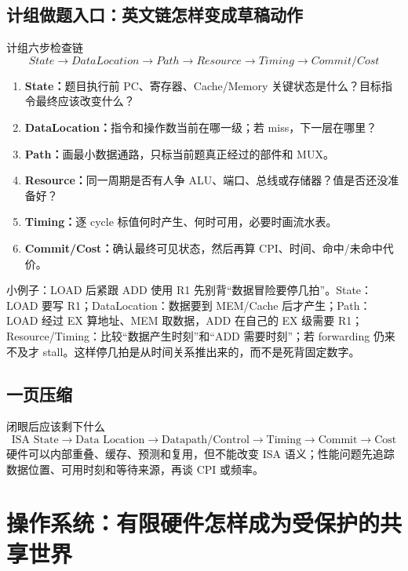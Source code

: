 \documentclass[11pt,a4paper,openany]{ctexbook}
\newcommand{\key}[1]{\textbf{\color{deep}#1}}
\begin{document}
\section{计组做题入口：英文链怎样变成草稿动作}
\begin{examBox}{计组六步检查链}
\[
\boxed{State\rightarrow DataLocation\rightarrow Path\rightarrow Resource\rightarrow Timing\rightarrow Commit/Cost}
\]
\begin{enumerate}
  \item \key{State：}题目执行前 PC、寄存器、Cache/Memory 关键状态是什么？目标指令最终应该改变什么？
  \item \key{DataLocation：}指令和操作数当前在哪一级；若 miss，下一层在哪里？
  \item \key{Path：}画最小数据通路，只标当前题真正经过的部件和 MUX。
  \item \key{Resource：}同一周期是否有人争 ALU、端口、总线或存储器？值是否还没准备好？
  \item \key{Timing：}逐 cycle 标值何时产生、何时可用，必要时画流水表。
  \item \key{Commit/Cost：}确认最终可见状态，然后再算 CPI、时间、命中/未命中代价。
\end{enumerate}
\end{examBox}

\begin{methodbox}{小例子：LOAD 后紧跟 ADD 使用 R1}
先别背“数据冒险要停几拍”。State：LOAD 要写 R1；DataLocation：数据要到 MEM/Cache 后才产生；Path：LOAD 经过 EX 算地址、MEM 取数据，ADD 在自己的 EX 级需要 R1；Resource/Timing：比较“数据产生时刻”和“ADD 需要时刻”；若 forwarding 仍来不及才 stall。这样停几拍是从时间关系推出来的，而不是死背固定数字。
\end{methodbox}

\section{一页压缩}
\begin{corebox}{闭眼后应该剩下什么}
\[
\boxed{\text{ISA State}\rightarrow\text{Data Location}\rightarrow\text{Datapath/Control}\rightarrow\text{Timing}\rightarrow\text{Commit}\rightarrow\text{Cost}}
\]
硬件可以内部重叠、缓存、预测和复用，但不能改变 ISA 语义；性能问题先追踪数据位置、可用时刻和等待来源，再谈 CPI 或频率。
\end{corebox}

\chapter{操作系统：有限硬件怎样成为受保护的共享世界}
\end{document}
